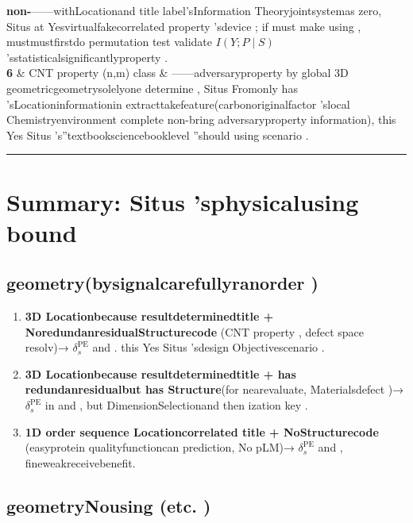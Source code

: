 \documentclass[
  12pt,
]{article}
\providecommand{\tightlist}{%
  \setlength{\itemsep}{0pt}\setlength{\parskip}{0pt}}
\begin{document}
\begin{longtable}[]
\textbf{non-}------withLocationand title label'sInformation Theoryjointsystemas zero, Situs
at Yesvirtualfakecorrelated property 'sdevice ; if must make using , mustmustfirstdo  permutation test validate 
\(I(Y;P \mid S)\) 'sstatisticalsignificantlyproperty .  \\
\textbf{6} & CNT property  (n,m) class  & \textbf{}------adversaryproperty by global  3D
geometricgeometrysolelyone determine , Situs
Fromonly has 'sLocationinformationin extracttakefeature(carbonoriginalfactor 'slocal Chemistryenvironment complete non-bring adversaryproperty information), this Yes
Situs 's''textbooksciencebooklevel ''should using scenario .  \\
\end{longtable}

\begin{center}\rule{0.5\linewidth}{0.5pt}\end{center}

\section{Summary: Situs
'sphysicalusing bound }\label{ux603bux7ed3situs-ux7684ux7269ux7406ux9002ux7528ux8fb9ux754c}

\subsection{geometry(bysignalcarefullyranorder )}\label{ux5b83ux4f55ux65f6ux5de5ux4f5cux6309ux4fe1ux5fc3ux6392ux5e8f}

\begin{enumerate}
\def\labelenumi{\arabic{enumi}.}
\tightlist
\item
  \textbf{3D Locationbecause resultdeterminedtitle  + NoredundanresidualStructurecode }(CNT
  property , defect space resolv)→ \(\delta_s^{\text{PE}}\) and  . this Yes Situs
  'sdesign Objectivescenario . 
\item
  \textbf{3D Locationbecause resultdeterminedtitle  +
  has redundanresidualbut has Structure}(for nearevaluate, Materialsdefect )→ \(\delta_s^{\text{PE}}\)
  in and  , but DimensionSelectionand then ization key . 
\item
  \textbf{1D order sequence Locationcorrelated title  + NoStructurecode }(easyprotein qualityfunctioncan prediction, No
  pLM)→ \(\delta_s^{\text{PE}}\) and  , fineweakreceivebenefit. 
\end{enumerate}

\subsection{geometryNousing (etc. )}\label{ux5b83ux4f55ux65f6ux65e0ux7528ux52a0ux4e86ux7b49ux4e8eux767dux52a0}
\end{document}
